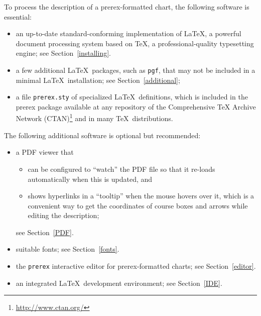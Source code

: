 \documentclass[11pt]{article}
\def\LaTeX{\mbox{LaTeX}}
\def\TeX{TeX}
\newcommand{\myurl}[1]{\textcolor{blue}{\underline{\textcolor{black}{\url{#1}}}}}
\begin{document}
To process the description of a prerex-formatted chart, the following software is
essential:
\begin{itemize}
\item an up-to-date standard-conforming implementation of \LaTeX, a powerful
document processing system based on \TeX, a professional-quality typesetting
engine; see Section~\ref{installing}.
\item a few additional \LaTeX\ packages, such as \texttt{pgf}, that may not be included in a minimal \LaTeX\ installation; see Section~\ref{additional};
\item a file \texttt{prerex.sty} of specialized \LaTeX\ definitions,
which is included in the prerex package
available at any repository
of
the Comprehensive TeX Archive Network (CTAN)\footnote{%
\myurl{http://www.ctan.org/}}
and in many \TeX\ distributions.
\end{itemize}
The following additional software is optional but recommended:
\begin{itemize}
\item a PDF viewer that 
\begin{itemize}
\item can be configured to ``watch'' the PDF file so that it re-loads
automatically when this is updated, and 
\item shows hyperlinks
in a ``tooltip'' when the mouse hovers over it, which is a convenient way to get
the coordinates of course boxes and arrows while editing the description;
\end{itemize}
see Section~\ref{PDF}.
\item suitable fonts; see Section~\ref{fonts}.
\item the \texttt{prerex} interactive editor for prerex-formatted charts;
see Section~\ref{editor}.
\item an integrated \LaTeX\ development environment; see Section~\ref{IDE}.
\end{itemize}
\end{document}
